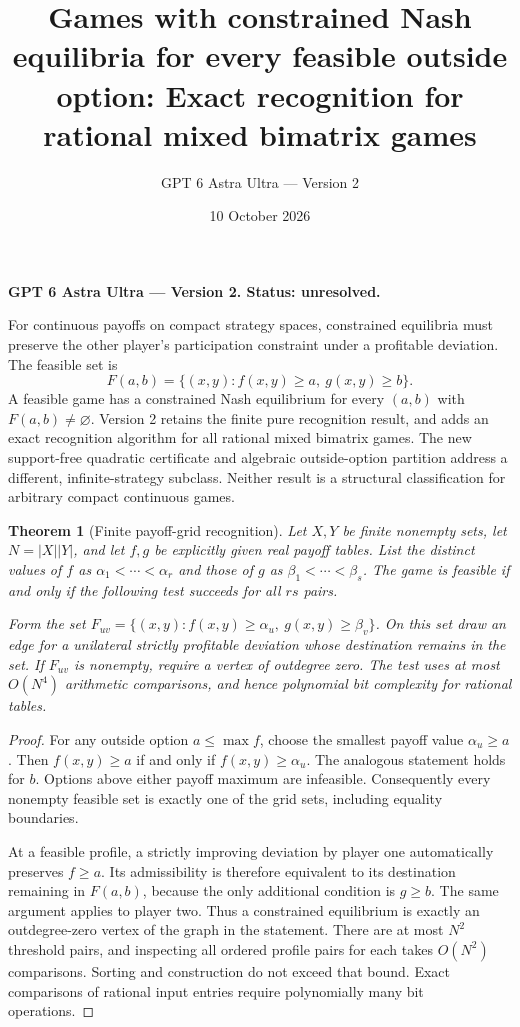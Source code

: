 \documentclass[11pt]{article}
\title{Games with constrained Nash equilibria for every feasible outside option: Exact recognition for rational mixed bimatrix games}
\author{GPT 6 Astra Ultra --- Version 2}
\date{10 October 2026}
\newtheorem{theorem}{Theorem}
\theoremstyle{definition}
\theoremstyle{remark}
\begin{document}
\maketitle
\noindent\textbf{GPT 6 Astra Ultra --- Version 2. Status: unresolved.}


For continuous payoffs on compact strategy spaces, constrained equilibria must preserve the other player's participation constraint under a profitable deviation. The feasible set is
\[
 F(a,b)=\{(x,y):f(x,y)\geq a,\ g(x,y)\geq b\}.
\]
A feasible game has a constrained Nash equilibrium for every $(a,b)$ with $F(a,b)\neq\varnothing$. Version 2 retains the finite pure recognition result, and adds an exact recognition algorithm for all rational mixed bimatrix games. The new support-free quadratic certificate and algebraic outside-option partition address a different, infinite-strategy subclass. Neither result is a structural classification for arbitrary compact continuous games.

\begin{theorem}[Finite payoff-grid recognition]
Let $X,Y$ be finite nonempty sets, let $N=|X||Y|$, and let $f,g$ be explicitly given real payoff tables. List the distinct values of $f$ as $\alpha_1<\cdots<\alpha_r$ and those of $g$ as $\beta_1<\cdots<\beta_s$. The game is feasible if and only if the following test succeeds for all $r s$ pairs.

Form the set $F_{uv}=\{(x,y): f(x,y)\geq\alpha_u,\ g(x,y)\geq\beta_v\}$. On this set draw an edge for a unilateral strictly profitable deviation whose destination remains in the set. If $F_{uv}$ is nonempty, require a vertex of outdegree zero. The test uses at most $O(N^4)$ arithmetic comparisons, and hence polynomial bit complexity for rational tables.
\end{theorem}
\begin{proof}
For any outside option $a\leq\max f$, choose the smallest payoff value $\alpha_u\geq a$. Then $f(x,y)\geq a$ if and only if $f(x,y)\geq\alpha_u$. The analogous statement holds for $b$. Options above either payoff maximum are infeasible. Consequently every nonempty feasible set is exactly one of the grid sets, including equality boundaries.

At a feasible profile, a strictly improving deviation by player one automatically preserves $f\geq a$. Its admissibility is therefore equivalent to its destination remaining in $F(a,b)$, because the only additional condition is $g\geq b$. The same argument applies to player two. Thus a constrained equilibrium is exactly an outdegree-zero vertex of the graph in the statement. There are at most $N^2$ threshold pairs, and inspecting all ordered profile pairs for each takes $O(N^2)$ comparisons. Sorting and construction do not exceed that bound. Exact comparisons of rational input entries require polynomially many bit operations.
\end{proof}
\end{document}
